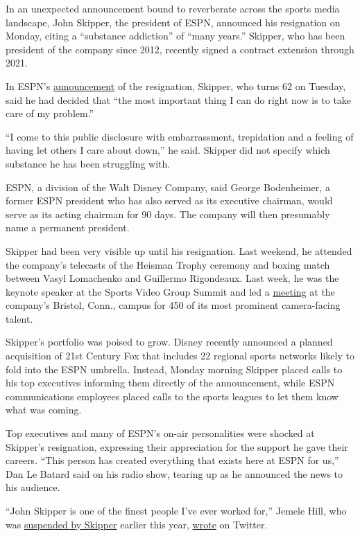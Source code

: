In an unexpected announcement bound to reverberate across the sports
media landscape, John Skipper, the president of ESPN, announced his
resignation on Monday, citing a ``substance addiction'' of ``many
years.'' Skipper, who has been president of the company since 2012,
recently signed a contract extension through 2021.

In ESPN's
\href{http://espnmediazone.com/us/press-releases/2017/12/news-regarding-john-skipper/}{announcement}
of the resignation, Skipper, who turns 62 on Tuesday, said he had
decided that ``the most important thing I can do right now is to take
care of my problem.''

``I come to this public disclosure with embarrassment, trepidation and a
feeling of having let others I care about down,'' he said. Skipper did
not specify which substance he has been struggling with.

ESPN, a division of the Walt Disney Company, said George Bodenheimer, a
former ESPN president who has also served as its executive chairman,
would serve as its acting chairman for 90 days. The company will then
presumably name a permanent president.

Skipper had been very visible up until his resignation. Last weekend, he
attended the company's telecasts of the Heisman Trophy ceremony and
boxing match between Vasyl Lomachenko and Guillermo Rigondeaux. Last
week, he was the keynote speaker at the Sports Video Group Summit and
led a
\href{https://www.espnfrontrow.com/2017/12/espn-commentators-gather-summit-bristol/}{meeting}
at the company's Bristol, Conn., campus for 450 of its most prominent
camera-facing talent.

Skipper's portfolio was poised to grow. Disney recently announced a
planned acquisition of 21st Century Fox that includes 22 regional sports
networks likely to fold into the ESPN umbrella. Instead, Monday morning
Skipper placed calls to his top executives informing them directly of
the announcement, while ESPN communications employees placed calls to
the sports leagues to let them know what was coming.

Top executives and many of ESPN's on-air personalities were shocked at
Skipper's resignation, expressing their appreciation for the support he
gave their careers. ``This person has created everything that exists
here at ESPN for us,'' Dan Le Batard said on his radio show, tearing up
as he announced the news to his audience.

``John Skipper is one of the finest people I've ever worked for,''
Jemele Hill, who was
\href{https://www.nytimes3xbfgragh.onion/2017/10/09/sports/football/jemele-hill-suspended-espn.html}{suspended
by Skipper} earlier this year,
\href{https://twitter.com/jemelehill/status/942795613254684672}{wrote}
on Twitter.

